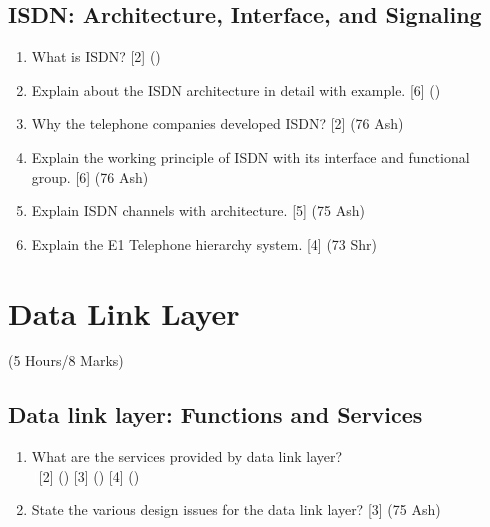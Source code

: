 \documentclass[12pt]{article}
\newcommand{\enter}{\\\textcolor{white}{1}}
\begin{document}
	\subsection{ISDN: Architecture, Interface, and Signaling}
		\begin{enumerate}[noitemsep, topsep=0pt]
			\item What is ISDN? \hfill [2] ()
			
			\item Explain about the ISDN architecture in detail with example. \hfill [6] ()
			
			\item Why the telephone companies developed ISDN? \hfill [2] (76 Ash)
			
			\item Explain the working principle of ISDN with its interface and functional group. \hfill [6] (76 Ash)
			
			\item Explain ISDN channels with architecture. \hfill [5] (75 Ash)
			
			\item Explain the E1 Telephone hierarchy system. \hfill [4] (73 Shr)
		\end{enumerate}

	\pagebreak

\section{Data Link Layer}
	\begin{center}(5 Hours/8 Marks)\end{center}
	\subsection{Data link layer: Functions and Services}
		\begin{enumerate}[noitemsep, topsep=0pt]
			\item What are the services provided by data link layer?
			\enter\hfill [2] () [3] () [4] () 

			\item State the various design issues for the data link layer? \hfill [3] (75 Ash)
		\end{enumerate}
		
\end{document}
